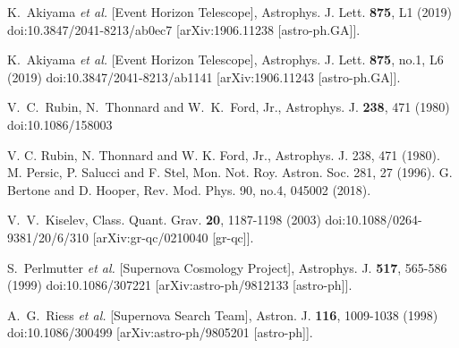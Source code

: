 \documentclass[a4paper,11pt]{article}
\begin{document}
\begin{thebibliography}{100}
K.~Akiyama \textit{et al.} [Event Horizon Telescope],
Astrophys. J. Lett. \textbf{875}, L1 (2019)
doi:10.3847/2041-8213/ab0ec7
[arXiv:1906.11238 [astro-ph.GA]].

K.~Akiyama \textit{et al.} [Event Horizon Telescope],
Astrophys. J. Lett. \textbf{875}, no.1, L6 (2019)
doi:10.3847/2041-8213/ab1141
[arXiv:1906.11243 [astro-ph.GA]].

V.~C.~Rubin, N.~Thonnard and W.~K.~Ford, Jr.,
Astrophys. J. \textbf{238}, 471 (1980)
doi:10.1086/158003

 V. C. Rubin, N. Thonnard and W. K. Ford, Jr., Astrophys. J. 238, 471 (1980).
 M. Persic, P. Salucci and F. Stel, Mon. Not. Roy. Astron. Soc. 281, 27 (1996).
G. Bertone and D. Hooper, Rev. Mod. Phys. 90, no.4, 045002 (2018).

V.~V.~Kiselev,
Class. Quant. Grav. \textbf{20}, 1187-1198 (2003)
doi:10.1088/0264-9381/20/6/310
[arXiv:gr-qc/0210040 [gr-qc]].

S.~Perlmutter \textit{et al.} [Supernova Cosmology Project],
Astrophys. J. \textbf{517}, 565-586 (1999)
doi:10.1086/307221
[arXiv:astro-ph/9812133 [astro-ph]].

A.~G.~Riess \textit{et al.} [Supernova Search Team],
Astron. J. \textbf{116}, 1009-1038 (1998)
doi:10.1086/300499
[arXiv:astro-ph/9805201 [astro-ph]].


\end{thebibliography}
\end{document}
